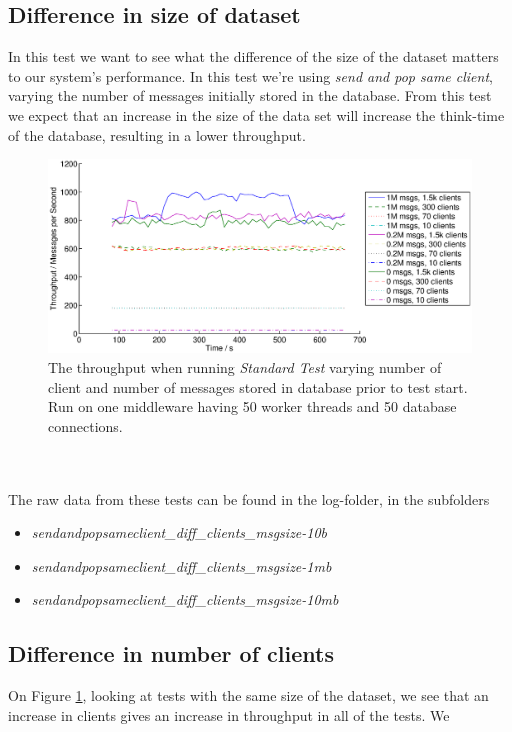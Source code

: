 \documentclass{article}
\begin{document}
        \subsection{Difference in size of dataset}
            In this test we want to see what the difference of the size of the dataset matters to our system's performance. In this test we're using \textit{send and pop same client}, varying the number of messages initially stored in the database. From this test we expect that an increase in the size of the data set will increase the think-time of the database, resulting in a lower throughput.
            \begin{figure}[H]
                \hspace{-1.5cm}
                \includegraphics[scale=0.55]{msg_db_clients}
                \caption{The throughput when running \textit{Standard Test} varying number of client and number of messages stored in database prior to test start. Run on one middleware having 50 worker threads and 50 database connections.}
                \label{fig:msg_db_clients}
            \end{figure}
            ~\\
            \\
            The raw data from these tests can be found in the log-folder, in the subfolders
            \begin{itemize}
                \item \textit{sendandpopsameclient\_diff\_clients\_msgsize-10b}
                \item \textit{sendandpopsameclient\_diff\_clients\_msgsize-1mb}
                \item \textit{sendandpopsameclient\_diff\_clients\_msgsize-10mb}
            \end{itemize}

        \subsection{Difference in number of clients}
            On Figure \ref{fig:msg_db_clients}, looking at tests with the same size of the dataset, we see that an increase in clients gives an increase in throughput in all of the tests. We 
\end{document}
